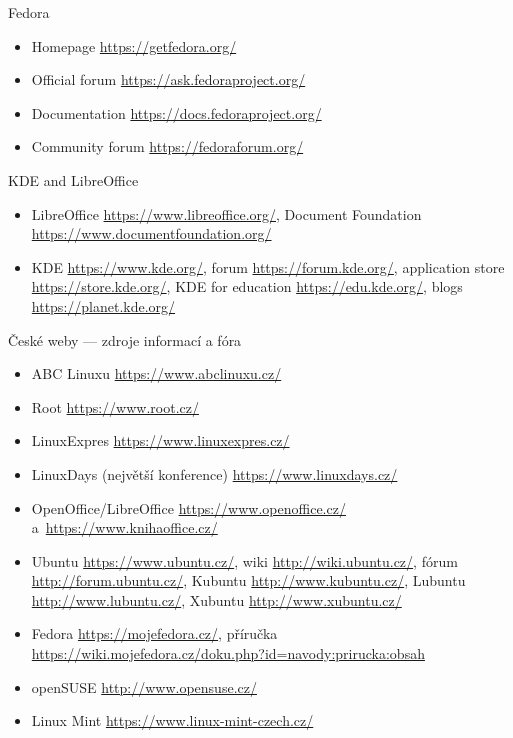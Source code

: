 \documentclass[compress, ucs, xelatex, 11pt, xcolor=svgnames,
  hyperref={
    bookmarks=true,
    unicode=true,
    colorlinks=true,
    pdftitle={Linux, command line and MetaCentrum},
    plainpages=false,
    pdfauthor={Vojtech Zeisek},
    pdfsubject={Course about use of Linux command line, writing shell scripts and using MetaCentrum of CESNET},
    pdfcreator={XeLaTeX},
    pdfkeywords={Linux, GNU, BASH, shell, command line, MetaCentrum},
    linkcolor=DarkRed,
    anchorcolor=DarkBlue,
    citecolor=Indigo,
    filecolor=NavyBlue,
    menucolor=DarkMagenta,
    urlcolor=DarkBlue,
    pdftex},
  url={hyphens, lowtilde} %
  ]{beamer}
\begin{document}
\begin{frame}{Fedora}
  \begin{itemize}
    \item Homepage \url{https://getfedora.org/}
    \item Official forum \url{https://ask.fedoraproject.org/}
    \item Documentation \url{https://docs.fedoraproject.org/}
    \item Community forum \url{https://fedoraforum.org/}
  \end{itemize}
\end{frame}

\begin{frame}{KDE and LibreOffice}
  \begin{itemize}
    \item LibreOffice \url{https://www.libreoffice.org/}, Document Foundation \url{https://www.documentfoundation.org/}
    \item KDE \url{https://www.kde.org/}, forum \url{https://forum.kde.org/}, application store \url{https://store.kde.org/}, KDE for education \url{https://edu.kde.org/}, blogs \url{https://planet.kde.org/}
  \end{itemize}
\end{frame}

\begin{frame}{České weby --- zdroje informací a fóra}
  \begin{itemize}
    \item ABC Linuxu \url{https://www.abclinuxu.cz/}
    \item Root \url{https://www.root.cz/}
    \item LinuxExpres \url{https://www.linuxexpres.cz/}
    \item LinuxDays (největší konference) \url{https://www.linuxdays.cz/}
    \item OpenOffice/LibreOffice \url{https://www.openoffice.cz/} a~\url{https://www.knihaoffice.cz/}
    \item Ubuntu \url{https://www.ubuntu.cz/}, wiki \url{http://wiki.ubuntu.cz/}, fórum \url{http://forum.ubuntu.cz/}, Kubuntu \url{http://www.kubuntu.cz/}, Lubuntu \url{http://www.lubuntu.cz/}, Xubuntu \url{http://www.xubuntu.cz/}
    \item Fedora \url{https://mojefedora.cz/}, příručka \url{https://wiki.mojefedora.cz/doku.php?id=navody:prirucka:obsah}
    \item openSUSE \url{http://www.opensuse.cz/}
    \item Linux Mint \url{https://www.linux-mint-czech.cz/}
  \end{itemize}
\end{frame}
\end{document}
